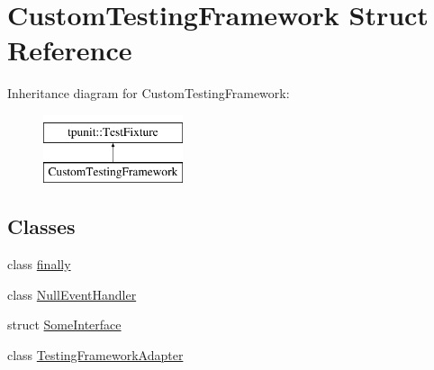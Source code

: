 \hypertarget{structCustomTestingFramework}{}\section{Custom\+Testing\+Framework Struct Reference}
\label{structCustomTestingFramework}
Inheritance diagram for Custom\+Testing\+Framework\+:\begin{figure}[H]
\begin{center}
\leavevmode
\includegraphics[height=2.000000cm]{structCustomTestingFramework}
\end{center}
\end{figure}
\subsection*{Classes}
\begin{DoxyCompactItemize}
\item 
class \mbox{\hyperlink{classCustomTestingFramework_1_1finally}{finally}}
\item 
class \mbox{\hyperlink{classCustomTestingFramework_1_1NullEventHandler}{Null\+Event\+Handler}}
\item 
struct \mbox{\hyperlink{structCustomTestingFramework_1_1SomeInterface}{Some\+Interface}}
\item 
class \mbox{\hyperlink{classCustomTestingFramework_1_1TestingFrameworkAdapter}{Testing\+Framework\+Adapter}}
\end{DoxyCompactItemize}

